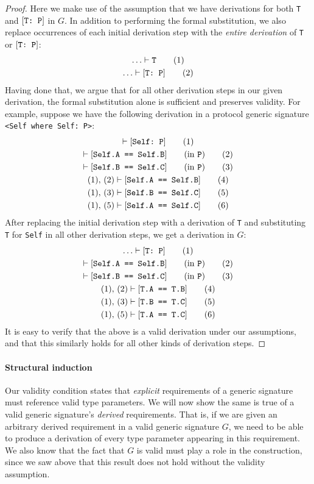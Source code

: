 \documentclass[../generics]{subfiles}
\begin{document}
\begin{proof}
Here we make use of the assumption that we have derivations for both \texttt{T} and $[\texttt{T:~P}]$ in $G$. In addition to performing the formal substitution, we also replace occurrences of each initial derivation step with the \emph{entire derivation} of \texttt{T} or $[\texttt{T:~P}]$:
\begin{gather}
\ldots \vdash \texttt{T}\tag{1}\\
\ldots \vdash [\texttt{T:~P}]\tag{2}
\end{gather}
Having done that, we argue that for all other derivation steps in our given derivation, the formal substitution alone is sufficient and preserves validity. For example, suppose we have the following derivation in a protocol generic signature \verb|<Self where Self: P>|:
\begin{gather}
\vdash[\texttt{Self:~P}]\tag{1}\\
\vdash[\texttt{Self.A == Self.B}]\qquad\mbox{(in \texttt{P})}\tag{2}\\
\vdash[\texttt{Self.B == Self.C}]\qquad\mbox{(in \texttt{P})}\tag{3}\\
(1),\,(2)\vdash[\texttt{Self.A == Self.B}]\tag{4}\\
(1),\,(3)\vdash[\texttt{Self.B == Self.C}]\tag{5}\\
(1),\,(5)\vdash[\texttt{Self.A == Self.C}]\tag{6}
\end{gather}
After replacing the initial derivation step with a derivation of \texttt{T} and substituting \texttt{T} for \texttt{Self} in all other derivation steps, we get a derivation in $G$:
\begin{gather}
\ldots \vdash[\texttt{T:~P}]\tag{1}\\
\vdash[\texttt{Self.A == Self.B}]\qquad\mbox{(in \texttt{P})}\tag{2}\\
\vdash[\texttt{Self.B == Self.C}]\qquad\mbox{(in \texttt{P})}\tag{3}\\
(1),\,(2)\vdash[\texttt{T.A == T.B}]\tag{4}\\
(1),\,(3)\vdash[\texttt{T.B == T.C}]\tag{5}\\
(1),\,(5)\vdash[\texttt{T.A == T.C}]\tag{6}
\end{gather}
It is easy to verify that the above is a valid derivation under our assumptions, and that this similarly holds for all other kinds of derivation steps.
\end{proof}

\paragraph{Structural induction}
Our validity condition states that \emph{explicit} requirements of a generic signature must reference valid type parameters. We will now show the same is true of a valid generic signature's \emph{derived} requirements. That is, if we are given an arbitrary derived requirement in a valid generic signature $G$, we need to be able to produce a derivation of every type parameter appearing in this requirement. We also know that the fact that $G$ is valid must play a role in the construction, since we saw above that this result does not hold without the validity assumption.
\end{document}

